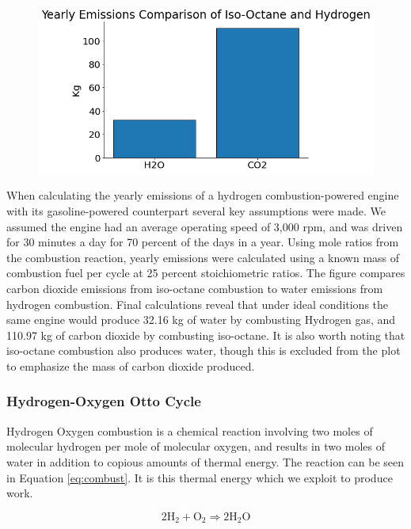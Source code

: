 \documentclass[conf]{new-aiaa}
\begin{document}
\begin{figure}[H]
    \centering
    \includegraphics[width=1\textwidth]{Figures/Y_emiss_update.png}
    \caption{}
    \label{fig:code}
\end{figure}

When calculating the yearly emissions of a hydrogen combustion-powered engine with its gasoline-powered counterpart several key assumptions were made. We assumed the engine had an average operating speed of 3,000 rpm, and was driven for 30 minutes a day for 70 percent of the days in a year. Using mole ratios from the combustion reaction, yearly emissions were calculated using a known mass of combustion fuel per cycle at 25 percent stoichiometric ratios. The figure compares carbon dioxide emissions from iso-octane combustion to water emissions from hydrogen combustion. Final calculations reveal that under ideal conditions the same engine would produce 32.16 kg of water by combusting Hydrogen gas, and 110.97 kg of carbon dioxide by combusting iso-octane. It is also worth noting that iso-octane combustion also produces water, though this is excluded from the plot to emphasize the mass of carbon dioxide produced.


\subsubsection{Hydrogen-Oxygen Otto Cycle}
Hydrogen Oxygen combustion is a chemical reaction involving two moles of molecular hydrogen per mole of molecular oxygen, and results in two moles of water in addition to copious amounts of thermal energy. The reaction can be seen in Equation \ref{eq:combust}. It is this thermal energy which we exploit to produce work.

\begin{equation}
\label{eq:combust}
    2\text{H}_2 + \text{O}_2 \Rightarrow 2\text{H}_2\text{O}
\end{equation}
\end{document}
